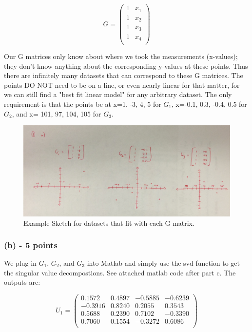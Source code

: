 \documentclass[11pt]{article}
\begin{document}
\begin{equation}
        \nonumber G =
\begin{pmatrix}
1 & x_1 \\
1 & x_2 \\
1 & x_3 \\
1 & x_4 \\
\end{pmatrix}
\end{equation}

Our G matrices only know about where we took the measurements (x-values); they don't know anything about the corresponding y-values at these points.  Thus there are infinitely many datasets that can correspond to these G matrices.  The points DO NOT need to be on a line, or even nearly linear for that matter, for we can still find a "best fit linear model" for any arbitrary dataset.  The only requirement is that the points be at x=1, -3, 4, 5 for $G_1$, x=-0.1, 0.3, -0.4, 0.5 for $G_2$, and x= 101, 97, 104, 105 for $G_3$.

\begin{figure}
\includegraphics[width=12cm]{FullSizeRender_1_.jpg}
\caption{Example Sketch for datasets that fit with each G matrix.}
\end{figure}
 

\subsubsection*{(b) - 5 points}
We plug in $G_1$, $G_2$, and $G_3$ into Matlab and simply use the svd function to get the singular value decompostions.  See attached matlab code after part c.  The outputs are:


\begin{equation}
        \nonumber U_1 =
\begin{pmatrix}
    0.1572  &  0.4897  & -0.5885  & -0.6239 \\
   -0.3916  &  0.8240  &  0.2055  &  0.3543 \\
    0.5688  &  0.2390  &  0.7102  & -0.3390 \\
    0.7060  &  0.1554  & -0.3272  &  0.6086 \\
\end{pmatrix}
\end{equation}
\end{document}
